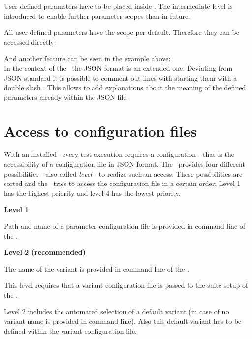 User defined parameters have to be placed inside . The intermediate level  is introduced to enable further
parameter scopes than  in future.

All user defined parameters have the scope  per default. Therefore they can be accessed directly:


And another feature can be seen in the example above:\\
In the context of the \pkg\ the JSON format is an extended one.
Deviating from JSON standard it is possible to comment out lines with starting them with a double slash \pcode{//}.
This allows to add explanations about the meaning of the defined parameters already within the JSON file.

\newpage

\section{Access to configuration files}

With an installed \pkg\ every test execution requires a configuration - that is the accessibility
of a configuration file in JSON format. The \pkg\ provides four different possibilities - also
called \textit{level} - to realize such an access. These possibilities are sorted and the \pkg\ tries to access
the configuration file in a certain order: Level 1 has the highest priority and level 4 has the lowest priority.

\textbf{Level 1}

Path and name of a parameter configuration file is provided in command line of the \rfwcore.

\textbf{Level 2 (recommended)}

The name of the variant is provided in command line of the \rfwcore.

This level requires that a variant configuration file is passed to the suite setup of the \pkg.

Level 2 includes the automated selection of a default variant (in case of no variant name is provided in command line).
Also this default variant has to be defined within the variant configuration file.

